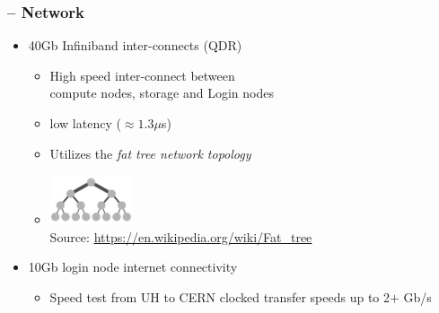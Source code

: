 

\begin{frame}
	\frametitle{{\craycs} -- Network}
	\begin{itemize}
		\item 40Gb Infiniband inter-connects (QDR)
		\begin{itemize}
			\item High speed inter-connect between~\\compute nodes, {\lustre} storage and Login nodes
                        \item low latency ($\approx1.3\mu$s)
			\item Utilizes the \emph{fat tree network topology}
			\item[] \includegraphics[width=0.20\textwidth]{images/Fat_tree_network} \\[-1ex] {\fontsize{3}{4} \selectfont Source: \url{https://en.wikipedia.org/wiki/Fat_tree} } 		
		\end{itemize}
		\item 10Gb login node internet connectivity
		\begin{itemize}
			\item Speed test from UH to CERN clocked transfer speeds up to 2$+$ Gb/s
		\end{itemize}	
	\end{itemize}
\end{frame}

